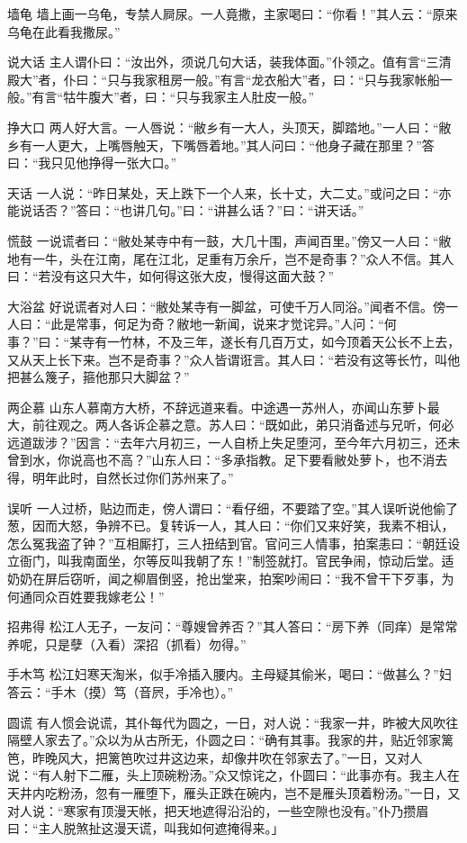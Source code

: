 \documentclass[12pt,UTF8]{ctexbook}
\begin{document}
墙龟
墙上画一乌龟，专禁人屙尿。一人竟撒，主家喝曰：“你看！”其人云：“原来乌龟在此看我撒尿。”

说大话
主人谓仆曰：“汝出外，须说几句大话，装我体面。”仆领之。值有言“三清殿大”者，仆曰：“只与我家租房一般。”有言“龙衣船大”者，曰：“只与我家帐船一般。”有言“牯牛腹大”者，曰：“只与我家主人肚皮一般。”

挣大口
两人好大言。一人唇说：“敝乡有一大人，头顶天，脚踏地。”一人曰：“敝乡有一人更大，上嘴唇触天，下嘴唇着地。”其人问曰：“他身子藏在那里？”答曰：“我只见他挣得一张大口。”

天话
一人说：“昨日某处，天上跌下一个人来，长十丈，大二丈。”或问之曰：“亦能说话否？”答曰：“也讲几句。”曰：“讲甚么话？”曰：“讲天话。”

慌鼓
一说谎者曰：“敝处某寺中有一鼓，大几十围，声闻百里。”傍又一人曰：“敝地有一牛，头在江南，尾在江北，足重有万余斤，岂不是奇事？”众人不信。其人曰：“若没有这只大牛，如何得这张大皮，慢得这面大鼓？”

大浴盆
好说谎者对人曰：“敝处某寺有一脚盆，可使千万人同浴。”闻者不信。傍一人曰：“此是常事，何足为奇？敝地一新闻，说来才觉诧异。”人问：“何事？”曰：“某寺有一竹林，不及三年，遂长有几百万丈，如今顶着天公长不上去，又从天上长下来。岂不是奇事？”众人皆谓诳言。其人曰：“若没有这等长竹，叫他把甚么篾子，箍他那只大脚盆？”

两企慕
山东人慕南方大桥，不辞远道来看。中途遇一苏州人，亦闻山东萝卜最大，前往观之。两人各诉企慕之意。苏人曰：“既如此，弟只消备述与兄听，何必远道跋涉？”因言：“去年六月初三，一人自桥上失足堕河，至今年六月初三，还未曾到水，你说高也不高？”山东人曰：“多承指教。足下要看敝处萝卜，也不消去得，明年此时，自然长过你们苏州来了。”

误听
一人过桥，贴边而走，傍人谓曰：“看仔细，不要踏了空。”其人误听说他偷了葱，因而大怒，争辨不已。复转诉一人，其人曰：“你们又来好笑，我素不相认，怎么冤我盗了钟？”互相厮打，三人扭结到官。官问三人情事，拍案恚曰：“朝廷设立衙门，叫我南面坐，尔等反叫我朝了东！”制签就打。官民争闹，惊动后堂。适奶奶在屏后窃听，闻之柳眉倒竖，抢出堂来，拍案吵闹曰：“我不曾干下歹事，为何通同众百姓要我嫁老公！”

招弗得
松江人无子，一友问：“尊嫂曾养否？”其人答曰：“房下养（同痒）是常常养呢，只是孽（入看）深招（抓看）勿得。”

手木笃
松江妇寒天淘米，似手冷插入腰内。主母疑其偷米，喝曰：“做甚么？”妇答云：“手木（摸）笃（音屄，手冷也）。”

圆谎
有人惯会说谎，其仆每代为圆之，一日，对人说：“我家一井，昨被大风吹往隔壁人家去了。”众以为从古所无，仆圆之曰：“确有其事。我家的井，贴近邻家篱笆，昨晚风大，把篱笆吹过井这边来，却像井吹在邻家去了。”一日，又对人说：“有人射下二雁，头上顶碗粉汤。”众又惊诧之，仆圆曰：“此事亦有。我主人在天井内吃粉汤，忽有一雁堕下，雁头正跌在碗内，岂不是雁头顶着粉汤。”一日，又对人说：“寒家有顶漫天帐，把天地遮得沿沿的，一些空隙也没有。”仆乃攒眉曰：“主人脱煞扯这漫天谎，叫我如何遮掩得来。」

\backmatter
\end{document}

